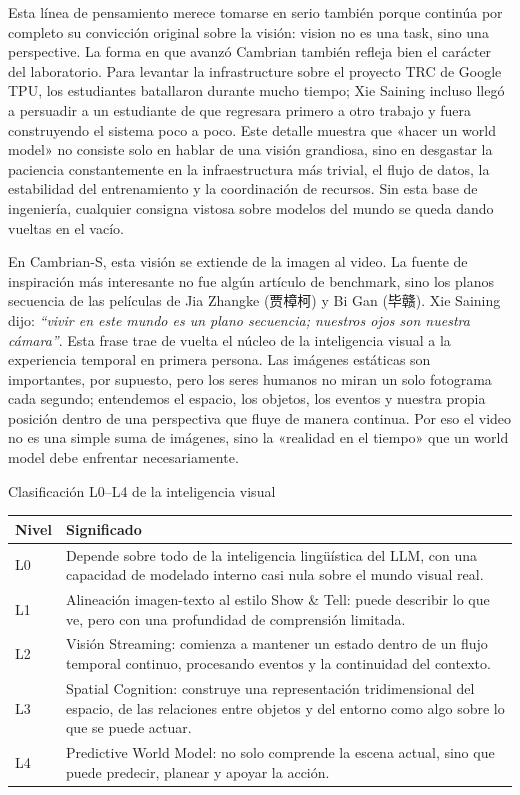 \documentclass[a4paper,12pt]{article}
\begin{document}
Esta línea de pensamiento merece tomarse en serio también porque continúa por completo su convicción original sobre la visión: vision no es una task, sino una perspective. La forma en que avanzó Cambrian también refleja bien el carácter del laboratorio. Para levantar la infrastructure sobre el proyecto TRC de Google TPU, los estudiantes batallaron durante mucho tiempo; Xie Saining incluso llegó a persuadir a un estudiante de que regresara primero a otro trabajo y fuera construyendo el sistema poco a poco. Este detalle muestra que «hacer un world model» no consiste solo en hablar de una visión grandiosa, sino en desgastar la paciencia constantemente en la infraestructura más trivial, el flujo de datos, la estabilidad del entrenamiento y la coordinación de recursos. Sin esta base de ingeniería, cualquier consigna vistosa sobre modelos del mundo se queda dando vueltas en el vacío.

En Cambrian-S, esta visión se extiende de la imagen al video. La fuente de inspiración más interesante no fue algún artículo de benchmark, sino los planos secuencia de las películas de Jia Zhangke (贾樟柯) y Bi Gan (毕赣). Xie Saining dijo: \textit{``vivir en este mundo es un plano secuencia; nuestros ojos son nuestra cámara''}. Esta frase trae de vuelta el núcleo de la inteligencia visual a la experiencia temporal en primera persona. Las imágenes estáticas son importantes, por supuesto, pero los seres humanos no miran un solo fotograma cada segundo; entendemos el espacio, los objetos, los eventos y nuestra propia posición dentro de una perspectiva que fluye de manera continua. Por eso el video no es una simple suma de imágenes, sino la «realidad en el tiempo» que un world model debe enfrentar necesariamente.

\begin{importantbox}{Clasificación L0--L4 de la inteligencia visual}
\begin{tabularx}{\textwidth}{>{\raggedright\arraybackslash}p{} Y}
\toprule
Nivel & Significado \\
\midrule
L0 & Depende sobre todo de la inteligencia lingüística del LLM, con una capacidad de modelado interno casi nula sobre el mundo visual real. \\
L1 & Alineación imagen-texto al estilo Show \& Tell: puede describir lo que ve, pero con una profundidad de comprensión limitada. \\
L2 & Visión Streaming: comienza a mantener un estado dentro de un flujo temporal continuo, procesando eventos y la continuidad del contexto. \\
L3 & Spatial Cognition: construye una representación tridimensional del espacio, de las relaciones entre objetos y del entorno como algo sobre lo que se puede actuar. \\
L4 & Predictive World Model: no solo comprende la escena actual, sino que puede predecir, planear y apoyar la acción. \\
\bottomrule
\end{tabularx}
\end{importantbox}
\end{document}
